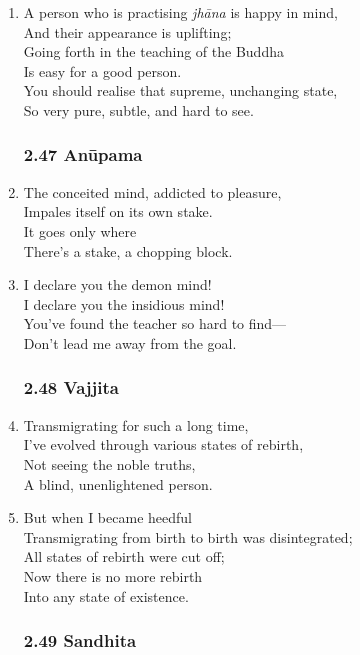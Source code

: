 \documentclass[10pt, openany]{book}
\begin{document}
\begin{enumerate}
\item A person who is practising \emph{jhāna} is happy in mind,\\
And their appearance is uplifting;\\
Going forth in the teaching of the Buddha \\
Is easy for a good person.\\
You should realise that supreme, unchanging state,\\
So very pure, subtle, and hard to see.

\subsubsection*{2.47 Anūpama}

\item The conceited mind, addicted to pleasure,\\
Impales itself on its own stake.\\
It goes only where\\
There’s a stake, a chopping block.

\item I declare you the demon mind!\\
I declare you the insidious mind!\\
You’ve found the teacher so hard to find—\\
Don’t lead me away from the goal.

\subsubsection*{2.48 Vajjita}

\item Transmigrating for such a long time,\\
I’ve evolved through various states of rebirth,\\
Not seeing the noble truths,\\
A blind, unenlightened person.

\item But when I became heedful\\
Transmigrating from birth to birth was disintegrated;\\
All states of rebirth were cut off;\\
Now there is no more rebirth \\
Into any state of existence.

\subsubsection*{2.49 Sandhita}


\end{enumerate}
\end{document}
